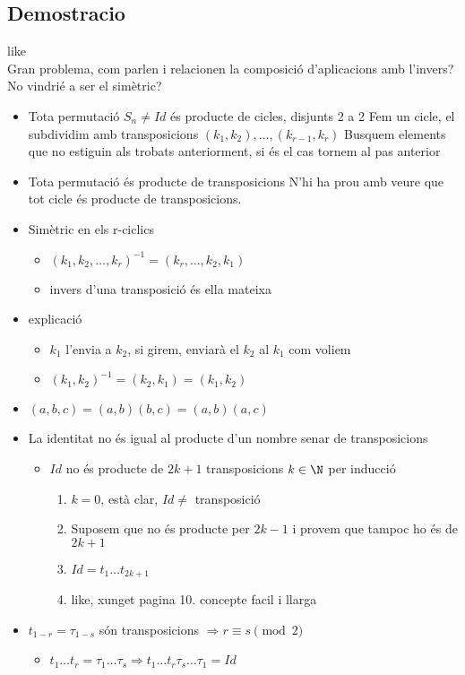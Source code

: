 \subsection*{Demostracio}
like\\
Gran problema, com parlen i relacionen la composició d'aplicacions amb l'invers? No vindrié a ser el simètric?
\begin{itemize}
\item Tota permutació $S_n \neq Id$ és producte de cicles, disjunts 2 a 2
	\subitem Fem un cicle, el subdividim amb transposicions $(k_1, k_2), \dots, (k_{r-1}, k_r)$
	\subitem Busquem elements que no estiguin als trobats anteriorment, si és el cas tornem al pas anterior
\item Tota permutació és producte de transposicions
	\subitem N'hi ha prou amb veure que tot cicle és producte de transposicions.
\item Simètric en els r-ciclics
	\begin{itemize}
	\item $(k_1, k_2, \dots, k_r)^{-1} = (k_r, \dots, k_2, k_1)$
	\item invers d'una transposició és ella mateixa
	\end{itemize}
\item explicació
	\begin{itemize}
	\item $k_1$ l'envia a $k_2$, si girem, enviarà el $k_2$ al $k_1$ com voliem
	\item $(k_1, k_2)^{-1} = (k_2, k_1) = (k_1, k_2)$
	\end{itemize}
\item $(a, b, c) = (a, b)(b, c) = (a, b)(a, c)$
\item La identitat no és igual al producte d'un nombre senar de transposicions
	\begin{itemize}
	\item $Id$ no és producte de $2k +1$ transposicions $k \in \N$ per inducció
		\begin{enumerate}
		\item $k = 0$, està clar, $Id \neq$ transposició
		\item Suposem que no és producte per $2k -1$ i provem que tampoc ho és de $2k +1$
		\item $Id = t_1\dots t_{2k+1}$
		\item like, xunget pagina 10. concepte facil i llarga
		\end{enumerate}
	\end{itemize}
\item $t_{1-r} = \tau_{1-s}$ són transposicions
	\subitem $\Rightarrow r \equiv s \pmod{2}$
	\begin{itemize}
	\item $t_1\dots t_r = \tau_1\dots \tau_s \Rightarrow t_1\dots t_r \tau_s \dots \tau_1 = Id$
	\end{itemize}
\end{itemize}

